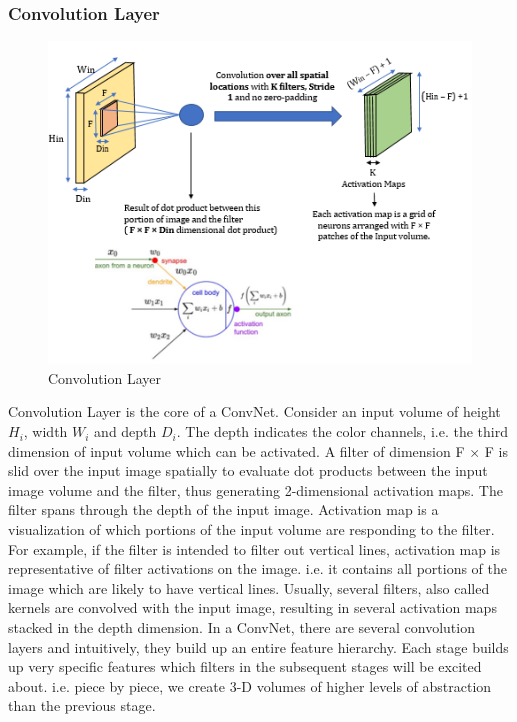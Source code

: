 \subsubsection{Convolution Layer \cite{cnn_ak}}  
\begin{figure}[h!]
  \includegraphics[width=\linewidth]{figures/ConvLayer.PNG}
  \caption{Convolution Layer
  \cite{cnn_ytak}}
  \label{fig:ConvLayer}
\end{figure}
Convolution Layer is the core of a ConvNet. Consider an input volume of height $H_i$, width $W_i$ and depth $D_i$. The depth indicates the color channels, i.e. the third dimension of input volume which can be activated. A filter of dimension F × F is slid over the input image spatially to evaluate dot products between the input image volume and the filter, thus generating 2-dimensional activation maps. The filter spans through the depth of the input image. 
\newline \newline Activation map is a visualization of which portions of the input volume are responding to the filter. For example, if the filter is intended to filter out vertical lines, activation map is representative of filter activations on the image. i.e. it contains all portions of the image which are likely to have vertical lines.  Usually, several filters, also called kernels are convolved with the input image, resulting in several activation maps stacked in the depth dimension. In a ConvNet, there are several convolution layers and intuitively, they build up an entire feature hierarchy. 
\newline
Each stage builds up very specific features which filters in the subsequent stages will be excited about. i.e. piece by piece, we create 3-D volumes of higher levels of abstraction than the previous stage\cite{zeiler2014visualizing}.\newline \newline
